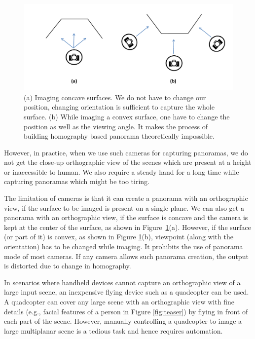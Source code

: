 \begin{figure}[htb]
\centering
\includegraphics[width=\textwidth]{figures/multiplanar/ConcaveConvex}
\caption[Imaging concave surfaces versus convex surfaces ]{(a) Imaging concave surfaces. We do not
have to change our position, changing orientation is sufficient to capture the
whole surface. (b) While imaging a convex surface, one have to change the
position as well as the viewing angle. It makes the process
of building homography based panorama  theoretically impossible.}
\label{fig:convex_concave}
\end{figure}

However, in practice, when we use such cameras for capturing
panoramas, we do not get the close-up orthographic view of the scenes which are
present at a height or inaccessible to human. We also require a steady hand for
a long time while capturing panoramas which might be too tiring.

The limitation of cameras is that it can create a panorama with an orthographic
view, if the surface to be imaged is present on a single plane. We can also get
a panorama with an orthographic view, if the surface is concave and the camera
is kept at the center of the surface, as shown in 
Figure~\ref{fig:convex_concave}(a). However, if the surface (or part of it) is
convex,  as shown in Figure \ref{fig:convex_concave}(b), viewpoint (along with
the orientation) has to be changed while imaging. It prohibits the use of
panorama mode of most cameras. If any camera allows such panorama creation, the
output is distorted due to change in homography.

In scenarios where handheld devices cannot capture an orthographic view of a
large input scene, an inexpensive flying device such as a quadcopter can be
used. A quadcopter can cover any large scene with an orthographic view with
fine details (e.g., facial features of a person in Figure \ref{fig:teaser})
by flying in front of each part of the scene. However, manually controlling a
quadcopter to image a large multiplanar scene is a tedious task and hence
requires automation.

